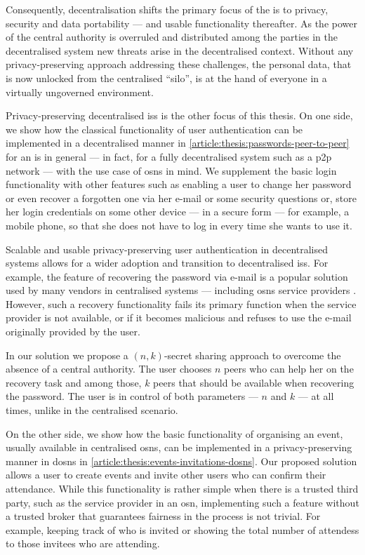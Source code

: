 Consequently, decentralisation shifts the primary focus of the \ac{is} 
to privacy, security and data portability --- and usable functionality thereafter. 
As the power of the central authority is overruled and distributed among the parties 
in the decentralised system new threats arise in the decentralised context. Without 
any privacy-preserving approach addressing these challenges, the personal data, 
that is now unlocked from the centralised ``silo'', is at the hand of everyone in 
a virtually ungoverned environment.

Privacy-preserving decentralised \acp{is} is the other focus of this thesis. On 
one side, we show how the classical functionality of user authentication can be 
implemented in a decentralised manner in \cref{article:thesis:passwords-peer-to-peer} 
for an \ac{is} in general --- in fact, for a fully decentralised system such as 
a \ac{p2p} network --- with the use case of \acp{osn} in mind. We supplement the 
basic login functionality with other features such as enabling a user to change 
her password or even recover a forgotten one via her e-mail or some security questions 
or, store her login credentials on some other device --- in a secure form --- for 
example, a mobile phone, so that she does not have to log in every time she wants 
to use it.

Scalable and usable privacy-preserving user authentication in decentralised systems 
allows for a wider adoption and transition to decentralised \acp{is}. 
For example, the feature of recovering the password via e-mail is a popular solution 
used by many vendors in centralised systems --- including \acp{osn} service providers 
\cite{Kuzma11}. However, such a recovery functionality fails its primary function 
when the service provider is not available, or if it becomes malicious and refuses 
to use the e-mail originally provided by the user. 

In our solution we propose a \((n, k)\)-secret sharing approach to overcome the absence 
of a central authority. The user chooses $n$ peers who can help her on the recovery 
task and among those, $k$ peers that should be available when recovering the password. 
The user is in control of both parameters --- $n$ and $k$ ---  at all times, unlike 
in the centralised scenario.

On the other side, we show how the basic functionality of organising an event, usually 
available in centralised \acp{osn}, can be implemented in a privacy-preserving manner 
in \acp{dosn} in \cref{article:thesis:events-invitations-dosns}. Our proposed solution 
allows a user to create events and invite other users who can confirm their attendance. 
While this functionality is rather simple when there is a trusted third party, such as 
the service provider in an \ac{osn}, implementing such a feature without a trusted 
broker that guarantees fairness in the process is not trivial. For example, keeping 
track of who is invited or showing the total number of attendess to those invitees 
who are attending.

